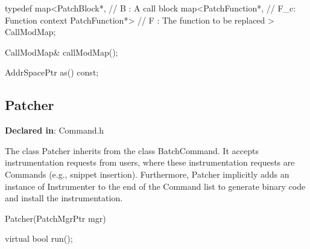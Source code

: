 \begin{apient}
typedef map<PatchBlock*,        // B  : A call block
            map<PatchFunction*, // F_c: Function context
                PatchFunction*> // F  : The function to be replaced
           > CallModMap;
\end{apient}



\begin{apient}
CallModMap& callModMap();
\end{apient}



\begin{apient}
AddrSpacePtr as() const;
\end{apient}



\subsection{Patcher}
\label{sec-3.2.6}

\textbf{Declared in}: Command.h

The class Patcher inherits from the class BatchCommand. It accepts
instrumentation requests from users, where these instrumentation requests are
Commands (e.g., snippet insertion). Furthermore, Patcher implicitly adds an
instance of Instrumenter to the end of the Command list to generate binary code
and install the instrumentation.


\begin{apient}
Patcher(PatchMgrPtr mgr)
\end{apient}



\begin{apient}
virtual bool run();
\end{apient}



